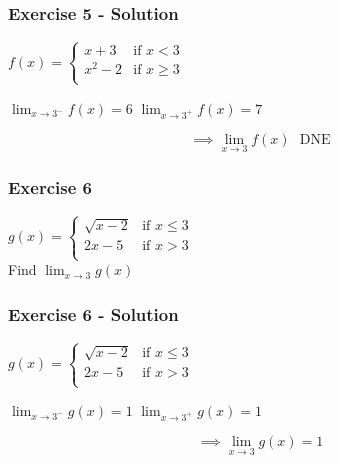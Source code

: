 \documentclass[12pt]{beamer}
\begin{document}
\begin{frame}
	\frametitle{Exercise 5 - Solution}
	\large
	\begin{center}
		$f(x) =
			\begin{cases}
				x+3   & \text{if } x < 3    \\
				x^2-2 & \text{if } x \geq 3 \\
			\end{cases}$\\
		\vspace*{\fill}
		\vspace*{\fill}
		\begin{table}[]
			$\displaystyle\lim_{x\to3^{-}}f(x)=6$
			\hspace{0.25cm}
			$\displaystyle\lim_{x\to3^{+}}f(x)=7$
		\end{table}
		\vspace*{\fill}
		\[\implies\displaystyle\lim_{x\to3}f(x) \text{ }\boxed{\text{DNE}}\]
	\end{center}
	\vspace*{\fill}
	\vspace*{\fill}
\end{frame}
\begin{frame}
	\frametitle{Exercise 6}
	\initclock
	\Large
	\begin{center}
		$g(x) =
			\begin{cases}
				\sqrt{x-2} & \text{if } x \leq 3 \\
				2x-5       & \text{if } x > 3    \\
			\end{cases}
		$\\
		\vspace*{\fill}
		\vspace*{\fill}
		\vspace*{\fill}
		Find $\displaystyle\lim_{x\to3}g(x)$\\
	\end{center}
	\vspace*{\fill}
	\vspace*{\fill}
	\crono
\end{frame}
\begin{frame}
	\frametitle{Exercise 6 - Solution}
	\large
	\begin{center}
		$g(x) =
			\begin{cases}
				\sqrt{x-2} & \text{if } x \leq 3 \\
				2x-5       & \text{if } x > 3    \\
			\end{cases}
		$\\
		\vspace*{\fill}
		\vspace*{\fill}
		\begin{table}[]
			$\displaystyle\lim_{x\to3^{-}}g(x)=1$
			\hspace{0.25cm}
			$\displaystyle\lim_{x\to3^{+}}g(x)=1$
		\end{table}
		\vspace*{\fill}
		\[\implies\displaystyle\lim_{x\to3}g(x) = \boxed{1}\]
	\end{center}
	\vspace*{\fill}
	\vspace*{\fill}
\end{frame}
\end{document}
